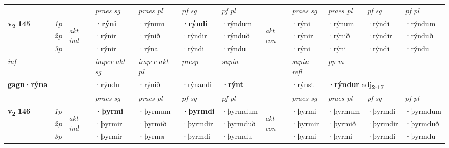 \begin{longtable}[l]{X>{\footnotesize\itshape}llXXXXlXXXX}
 & &   & \textit{praes sg}  & \textit{praes pl}    & \textit{ pf sg} & \textit{pf pl} & & \textit{praes sg}  & \textit{praes pl}    & \textit{pf sg} & \textit{pf pl }  \\ \cmidrule{4-7} \cmidrule{9-12}
 \multirow{2}{*}{{{\textbf{v{\textsubscript{2}}} \Large{\textbf{145}}}}}  & 1p & \multirow{3}{*}{\begin{turn}{90}\textit{akt ind}\end{turn}} & \textbf{·rýni} & ·rýnum & \textbf{·rýndi} & ·rýndum & \multirow{3}{*}{\begin{turn}{90}\textit{akt con}\end{turn}} &·rýni & ·rýnum & ·rýndi & ·rýndum\\*
 & 2p &  &  ·rýnir  & ·rýnið & ·rýndir & ·rýnduð & & ·rýnir & ·rýnið & ·rýndir & ·rýnduð \\*
 & 3p &  & ·rýnir & ·rýna & ·rýndi & ·rýndu & & ·rýni & ·rýni& ·rýndi & ·rýndu \\*
\cmidrule{4-7} \cmidrule{9-12}

   {\textit{inf}} & &  & \textit{imper akt sg} & \textit{imper akt pl}   & \textit{presp} & \textit{supin} && \textit{supin refl} & \textit{pp m} \\*
  {\textbf{gagn\allowbreak ·rýna}} & && ·rýndu  & ·rýnið   & ·rýnandi &  \textbf{·rýnt} && ·rýnst & \multicolumn{2}{l}{\textbf{·rýndur} adj\textbf{\textsubscript{2-17}}} \\*

\midrule

 & &   & \textit{praes sg}  & \textit{praes pl}    & \textit{ pf sg} & \textit{pf pl} & & \textit{praes sg}  & \textit{praes pl}    & \textit{pf sg} & \textit{pf pl }  \\ \cmidrule{4-7} \cmidrule{9-12}
 \multirow{2}{*}{{{\textbf{v{\textsubscript{2}}} \Large{\textbf{146}}}}}  & 1p & \multirow{3}{*}{\begin{turn}{90}\textit{akt ind}\end{turn}} & \textbf{·þyrmi} & ·þyrmum & \textbf{·þyrmdi} & ·þyrmdum & \multirow{3}{*}{\begin{turn}{90}\textit{akt con}\end{turn}} &·þyrmi & ·þyrmum & ·þyrmdi & ·þyrmdum\\*
 & 2p &  &  ·þyrmir  & ·þyrmið & ·þyrmdir & ·þyrmduð & & ·þyrmir & ·þyrmið & ·þyrmdir & ·þyrmduð \\*
 & 3p &  & ·þyrmir & ·þyrma & ·þyrmdi & ·þyrmdu & & ·þyrmi & ·þyrmi& ·þyrmdi & ·þyrmdu \\*
\cmidrule{4-7} \cmidrule{9-12}


\end{longtable}
